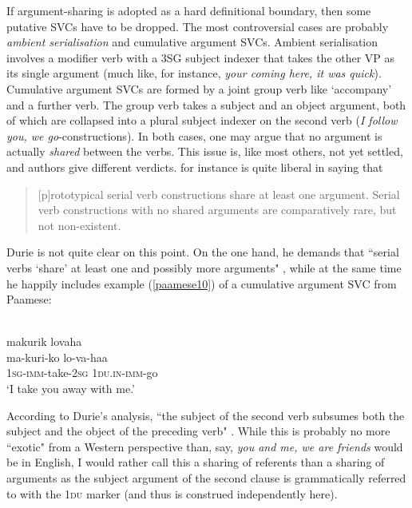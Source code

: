 If argument-sharing is adopted as a hard definitional boundary, then some putative SVCs have to be dropped. The most controversial cases are probably \textit{ambient serialisation} and cumulative argument SVCs. Ambient serialisation involves a modifier verb with a 3SG subject indexer that takes the other VP as its single argument (much like, for instance, \textit{your coming here, it was quick}). Cumulative argument SVCs are formed by a joint group verb like `accompany' and a further verb. The group verb takes a subject and an object argument, both of which are collapsed into a plural subject indexer on the second verb (\textit{I follow you, we go}-constructions). In both cases, one may argue that no argument is actually \emph{shared} between the verbs. This issue is, like most others, not yet settled, and authors give different verdicts. \citet[12]{Aikhenvald2006} for instance is quite liberal in saying that \begin{quote}[p]rototypical serial verb constructions share at least one argument. Serial verb constructions with no shared arguments are comparatively rare, but not non-existent.\end{quote}
Durie is not quite clear on this point. On the one hand, he demands that ``serial verbs `share' at least one and possibly more arguments" \citep[291]{Durie1997}, while at the same time he happily includes example (\ref{paamese10}) of a cumulative argument SVC from Paamese:

\ea \label{paamese10}
\\
\glll makurik lovaha \\
ma-kuri-ko lo-va-haa \\
\textsc{1}\textsc{sg}-\textsc{imm}-take-\textsc{2}\textsc{sg} \textsc{1}\textsc{du}.\textsc{in}-\textsc{imm}-go \\
\glft `I take you away with me.' \\ 
\z

According to Durie's analysis, ``the subject of the second verb subsumes both the subject and the object of the preceding verb" \citep[293]{Durie1997}. While this is probably no more ``exotic" from a Western perspective than, say, \textit{you and me, we are friends} would be in English, I would rather call this a sharing of referents than a sharing of arguments as the subject argument of the second clause is grammatically referred to with the 1\textsc{du} marker (and thus is construed independently here).

